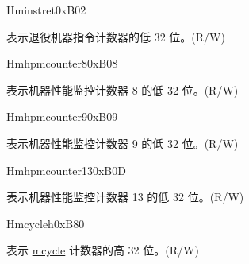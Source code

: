 \begin{register}{H}{minstret}{0xB02}\label{regdesc:MINSTRET}
%
\regnewline%
\begin{regdesc}\begin{reglist}
\label{fielddesc:MINSTRET}\item [MINSTRET] 表示退役机器指令计数器的低 32 位。(R/W)
\end{reglist}\end{regdesc}
\end{register}

\begin{register}{H}{mhpmcounter8}{0xB08}\label{regdesc:MHPMCOUNTER8}
%
\regnewline%
\begin{regdesc}\begin{reglist}
\label{fielddesc:MHPMCOUNTER8}\item [MHPMCOUNTER8] 表示机器性能监控计数器 8 的低 32 位。(R/W)
\end{reglist}\end{regdesc}
\end{register}

\begin{register}{H}{mhpmcounter9}{0xB09}\label{regdesc:MHPMCOUNTER9}
%
\regnewline%
\begin{regdesc}\begin{reglist}
\label{fielddesc:MHPMCOUNTER9}\item [MHPMCOUNTER9] 表示机器性能监控计数器 9 的低 32 位。(R/W)
\end{reglist}\end{regdesc}
\end{register}

\begin{register}{H}{mhpmcounter13}{0xB0D}\label{regdesc:MHPMCOUNTER13}
%
\regnewline%
\begin{regdesc}\begin{reglist}
\label{fielddesc:MHPMCOUNTER13}\item [MHPMCOUNTER13] 表示机器性能监控计数器 13 的低 32 位。(R/W)
\end{reglist}\end{regdesc}
\end{register}

\begin{register}{H}{mcycleh}{0xB80}\label{regdesc:MCYCLEH}
%
\regnewline%
\begin{regdesc}\begin{reglist}
\label{fielddesc:MCYCLEH}\item [MCYCLEH] 表示 \hyperref[regdesc:MCYCLE]{mcycle} 计数器的高 32 位。(R/W)
\end{reglist}\end{regdesc}
\end{register}

